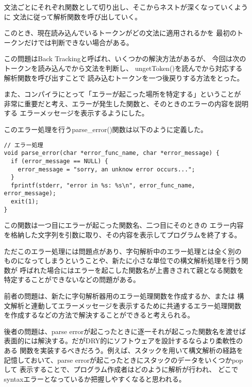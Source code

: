 \documentclass[11pt,a4j]{jarticle}
\begin{document}
文法ごとにそれぞれ関数として切り出し、そこからネストが深くなっていくように
文法に従って解析関数を呼び出していく。

\vspace{0.2in}

このとき、現在読み込んでいるトークンがどの文法に適用されるかを
最初のトークンだけでは判断できない場合がある。

この問題はBack Trackingと呼ばれ、いくつかの解決方法があるが、
今回は次のトークンを読み込んでから文法を判断し、
ungetToken()を読んでから対応する解析関数を呼び出すことで
読み込むトークンを一つ後戻りする方法をとった。

\vspace{0.2in}

また、コンパイラにとって「エラーが起こった場所を特定する」ということが
非常に重要だと考え、エラーが発生した関数と、そのときのエラーの内容を説明する
エラーメッセージを表示するようにした。

このエラー処理を行うparse\_error()関数は以下のように定義した。

\begin{verbatim}
// エラー処理
void parse_error(char *error_func_name, char *error_message) {
  if (error_message == NULL) {
    error_message = "sorry, an unknow error occurs...";
  }
  fprintf(stderr, "error in %s: %s\n", error_func_name, error_message);
  exit(1);
}
\end{verbatim}

この関数は一つ目にエラーが起こった関数名、二つ目にそのときの
エラー内容を格納した文字列を引数に取り、その内容を表示してプログラムを終了する。

ただこのエラー処理には問題点があり、字句解析中のエラー処理とは全く別の
ものになってしまうということや、新たに小さな単位での構文解析処理を行う関数が
呼ばれた場合にはエラーを起こした関数名が上書きされて親となる関数を
特定することができないなどの問題がある。

\vspace{0.2in}

前者の問題は、新たに字句解析器用のエラー処理関数を作成するか、または
構文解析と連動してエラーメッセージを表示するために共通するエラー処理関数
を作成するなどの方法で解決することができると考えられる。

\vspace{0.2in}

後者の問題は、parse errorが起こったときに逐一それが起こった関数名を渡せば
表面的には解決する。だがDRY的にソフトウェアを設計するならより柔軟性のある
関数を実装するべきだろう。例えば、スタックを用いて構文解析の経路を
記憶しておいて、parse errorが起こったときにスタックのデータをいくつかpopして
表示することで、プログラム作成者はどのように解析が行われ、
どこでsyntaxエラーとなっているか把握しやすくなると思われる。
\end{document}
